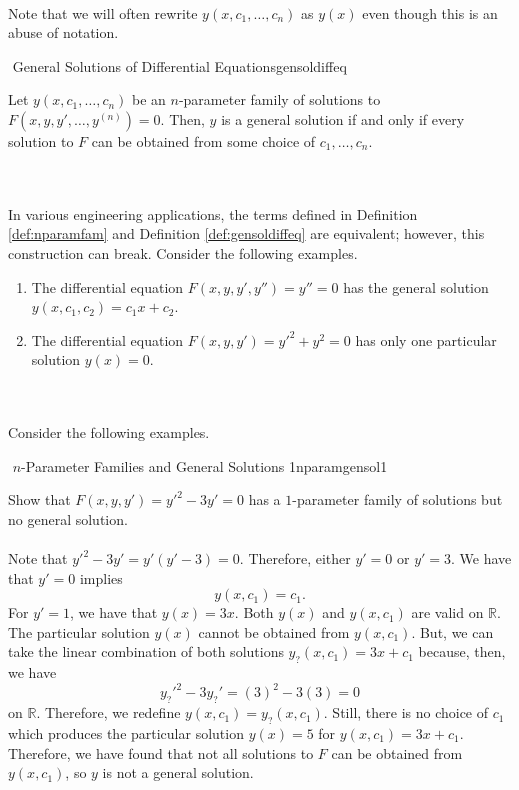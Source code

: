         \\
        Note that we will often rewrite \(y(x,c_1,\ldots,c_n)\) as \(y(x)\) even though this is an abuse of notation.
        \begin{definition}{\Stop\,\,General Solutions of Differential Equations}{gensoldiffeq}

            Let \(y(x,c_1,\ldots,c_n)\) be an \(n\)-parameter family of solutions to \(F(x,y,y',\ldots,y^{(n)})=0\). Then, \(y\) is a general solution if and only if every solution to \(F\) can be obtained from some choice of \(c_1,\ldots,c_n\).
            
        \end{definition}
        \vphantom
        \\
        \\
        In various engineering applications, the terms defined in Definition \ref{def:nparamfam} and Definition \ref{def:gensoldiffeq} are equivalent; however, this construction can break. Consider the following examples.
       \begin{enumerate}
            \item The differential equation \(F(x,y,y',y'')=y''=0\) has the general solution \(y(x,c_1,c_2)=c_1x+c_2\).
            \item The differential equation \(F(x,y,y')=y'^2+y^2=0\) has only one particular solution \(y(x)=0\).
       \end{enumerate}
       \pagebreak
       \vphantom
       \\
       \\
       Consider the following examples.
       \begin{example}{\Stop\,\,\(n\)-Parameter Families and General Solutions 1}{nparamgensol1}

            Show that \(F(x,y,y')=y'^2-3y'=0\) has a \(1\)-parameter family of solutions but no general solution.
            \\
            \\
            Note that \(y'^2-3y'=y'(y'-3)=0\). Therefore, either \(y'=0\) or \(y'=3\). We have that \(y'=0\) implies
            \begin{equation*}
                y(x,c_1)=c_1.
            \end{equation*}
            For \(y'=1\), we have that \(y(x)=3x\). Both \(y(x)\) and \(y(x,c_1)\) are valid on \(\mathbb{R}\). The particular solution \(y(x)\) cannot be obtained from \(y(x,c_1)\). But, we can take the linear combination of both solutions \(y_?(x,c_1)=3x+c_1\) because, then, we have
            \begin{equation*}
                y_?'^2-3y_?'=(3)^2-3(3)=0
            \end{equation*}
            on \(\mathbb{R}\). Therefore, we redefine \(y(x,c_1)=y_?(x,c_1)\). Still, there is no choice of \(c_1\) which produces the particular solution \(y(x)=5\) for \(y(x,c_1)=3x+c_1\). Therefore, we have found that not all solutions to \(F\) can be obtained from \(y(x,c_1)\), so \(y\) is not a general solution.

       \end{example}
